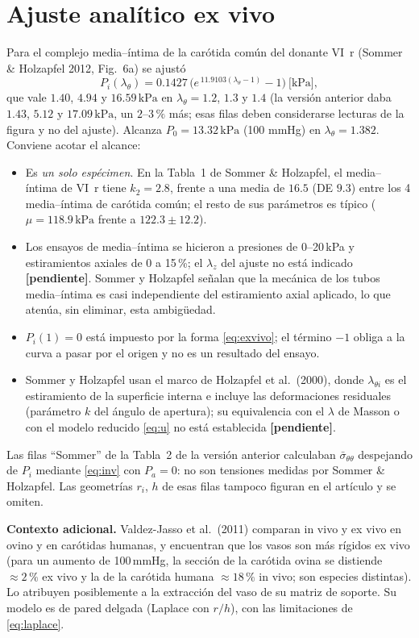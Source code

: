 \documentclass[11pt]{article}
\newcommand{\kPa}{\,\mathrm{kPa}}
\newcommand{\sbar}{\bar\sigma_{\theta\theta}}
\newcommand{\pend}{\textcolor{red!70!black}{\textbf{[pendiente]}}}
\begin{document}
\section{Ajuste analítico ex vivo}
Para el complejo media--íntima de la carótida común del donante VI~r (Sommer \& Holzapfel 2012, Fig.~6a) se ajustó
\begin{equation}
P_i(\lambda_\theta)=0.1427\,\bigl(e^{\,11.9103(\lambda_\theta-1)}-1\bigr)\ \text{[kPa]},
\label{eq:exvivo}
\end{equation}
que vale $1.40$, $4.94$ y $16.59\kPa$ en $\lambda_\theta=1.2$, $1.3$ y $1.4$ (la versión anterior daba $1.43$, $5.12$ y $17.09\kPa$, un $2$--$3\,\%$ más; esas filas deben considerarse lecturas de la figura y no del ajuste). Alcanza $P_0=13.32\kPa$ (100 mmHg) en $\lambda_\theta=1.382$. Conviene acotar el alcance:
\begin{itemize}
\item Es \emph{un solo espécimen}. En la Tabla~1 de Sommer \& Holzapfel, el media--íntima de VI~r tiene $k_2=2.8$, frente a una media de $16.5$ (DE $9.3$) entre los 4 media--íntima de carótida común; el resto de sus parámetros es típico ($\mu=118.9\kPa$ frente a $122.3\pm12.2$).
\item Los ensayos de media--íntima se hicieron a presiones de 0--20\,kPa y estiramientos axiales de 0 a 15\,\%; el $\lambda_z$ del ajuste no está indicado \pend. Sommer y Holzapfel señalan que la mecánica de los tubos media--íntima es casi independiente del estiramiento axial aplicado, lo que atenúa, sin eliminar, esta ambigüedad.
\item $P_i(1)=0$ está impuesto por la forma \eqref{eq:exvivo}; el término $-1$ obliga a la curva a pasar por el origen y no es un resultado del ensayo.
\item Sommer y Holzapfel usan el marco de Holzapfel et al.\ (2000), donde $\lambda_{\theta i}$ es el estiramiento de la superficie interna e incluye las deformaciones residuales (parámetro $k$ del ángulo de apertura); su equivalencia con el $\lambda$ de Masson o con el modelo reducido \eqref{eq:u} no está establecida \pend.
\end{itemize}
Las filas ``Sommer'' de la Tabla~2 de la versión anterior calculaban $\sbar$ despejando de $P_i$ mediante \eqref{eq:inv} con $P_a=0$: no son tensiones medidas por Sommer \& Holzapfel. Las geometrías $r_i$, $h$ de esas filas tampoco figuran en el artículo y se omiten.

\textbf{Contexto adicional.} Valdez-Jasso et al.\ (2011) comparan in vivo y ex vivo en ovino y en carótidas humanas, y encuentran que los vasos son más rígidos ex vivo (para un aumento de 100\,mmHg, la sección de la carótida ovina se distiende $\approx2\,\%$ ex vivo y la de la carótida humana $\approx18\,\%$ in vivo; son especies distintas). Lo atribuyen posiblemente a la extracción del vaso de su matriz de soporte. Su modelo es de pared delgada (Laplace con $r/h$), con las limitaciones de \eqref{eq:laplace}.
\end{document}

